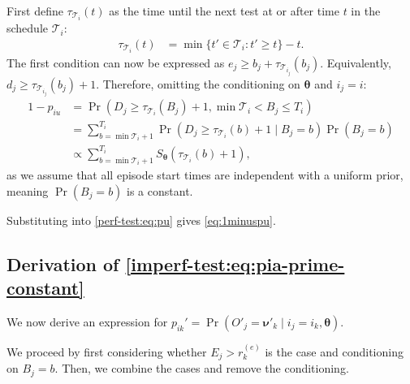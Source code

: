 \documentclass{article}
\makeatletter
\DeclareMathOperator{\prob}{\mathrm{Pr}}
\renewcommand{\vec}[1]{\bm{#1}}
\newcommand{\ssep}{:}
\newcommand{\sched}{\mathcal{T}}
\DeclareRobustCommand\onedot{\futurelet\@let@token\@onedot}
\def\@onedot{\ifx\@let@token.\else.\null\fi\xspace}
\def\ie{i.e\onedot} \def\Ie{{I.e}\onedot}
\makeatother
\begin{document}
First define $\tau_{\sched_i}(t)$ as the time until the next test at or after time $t$ in the schedule $\sched_i$:
\begin{align}
\tau_{\sched_i}(t) &= \min \{ t' \in \sched_i : t' \geq t \} - t.
\label{perf-test:eq:tau-def}
\end{align}
The first condition can now be expressed as $e_j \geq b_j + \tau_{\sched_{i_j}}(b_j)$.
Equivalently, $d_j \geq \tau_{\sched_{i_j}}(b_j) + 1$.
Therefore, omitting the conditioning on $\vec{\theta}$ and $i_j = i$:
\begin{align}
1 - p_{iu}
&= \prob(D_j \geq \tau_{\sched_{i}}(B_j)+ 1, \min \sched_{i} < B_j \leq T_{i}) \\
&= \sum_{b = \min \sched_{i} + 1}^{T_{i}} \prob(D_j \geq \tau_{\sched_{i}}(b) + 1 \mid B_j = b) \prob(B_j = b)\\
&\propto \sum_{b = \min \sched_{i} + 1}^{T_{i}} S_{\vec{\theta}}(\tau_{\sched_{i}}(b) + 1),
\label{perf-test:eq:piu}
\end{align}
as we assume that all episode start times are independent with a uniform prior, meaning $\prob(B_j = b)$ is a constant.

Substituting into \cref{perf-test:eq:pu} gives \cref{eq:1minuspu}.

\subsection{Derivation of \cref{imperf-test:eq:pia-prime-constant}}

We now derive an expression for $p_{ik}' = \prob(O'_j = \vec{\nu}'_k \mid i_j = i_k, \vec{\theta})$.

We proceed by first considering whether $E_j > r_k^{(e)}$ is the case and conditioning on $B_j = b$.
Then, we combine the cases and remove the conditioning.
\end{document}
